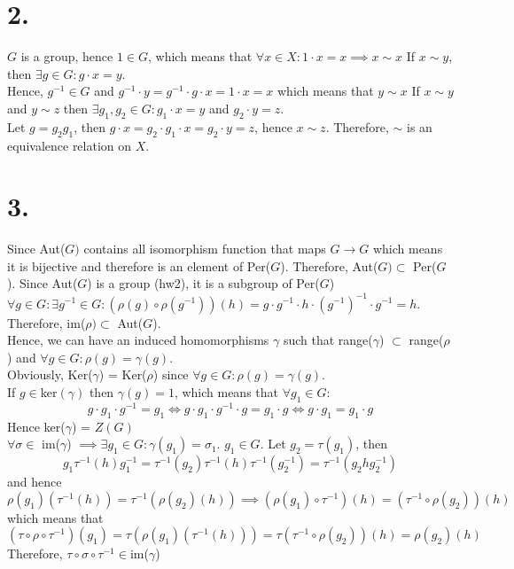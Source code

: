 \documentclass[11pt]{article}
\begin{document}
\section*{2.}
$G$ is a group, hence $1 \in G$, which means that $\forall x \in X: 1 \cdot x = x \implies x \sim x$
If $x \sim y$, then $\exists g \in G: g \cdot x = y$. \\
Hence, $g^{-1} \in G$ and $g^{-1} \cdot y = g^{-1} \cdot g \cdot x = 1 \cdot x = x$ which means that $y \sim x$
If $x \sim y$ and $y \sim z$ then $\exists g_1,g_2 \in G: g_1 \cdot x = y$ and $g_2 \cdot y = z$. \\
Let $g = g_2 g_1$, then $g \cdot x = g_2 \cdot g_1 \cdot x = g_2 \cdot y = z$, hence $x \sim z$.
Therefore, $\sim$ is an equivalence relation on $X$.
\pagebreak
\section*{3.}
Since Aut($G)$ contains all isomorphism function that maps $G \to G$ which means it is bijective and therefore is an element of Per($G$). Therefore, Aut($G ) \subset$ Per($G$). Since Aut($G$) is a group (hw2), it is a subgroup of Per($G$) \\ 
$\forall g \in G: \exists g^{-1} \in G: (\rho(g) \circ \rho(g^{-1}))(h) = g \cdot g^{-1} \cdot h \cdot (g^{-1})^{-1} \cdot g^{-1} =  h$.
Therefore, im($\rho ) \subset$ Aut($G$). \\
Hence, we can have an induced homomorphisms $\gamma$
such that range($\gamma$) $\subset$ range($\rho$) and $\forall g \in G: \rho(g) = \gamma(g)$. \\
Obviously, Ker($\gamma$) = Ker($\rho$) since $\forall g \in G: \rho(g) = \gamma(g)$. \\
If $g \in $ker$(\gamma)$ then $\gamma(g) = 1$, which means that $\forall g_1 \in G:$ 
\[g \cdot g_1 \cdot g^{-1} = g_1 \iff g \cdot g_1 \cdot g^{-1} \cdot g = g_1 \cdot g \iff g \cdot g_1 = g_1 \cdot g\] 
Hence ker($\gamma$) = $Z(G)$\\
$\forall \sigma \in$ im($\gamma$) $ \implies \exists g_1 \in G: \gamma(g_1) = \sigma_1$.
$g_1 \in G$. Let $g_2 = \tau(g_1)$, then 
\[
g_1 \tau^{-1}(h) g_1^{-1} = \tau^{-1}(g_2) \tau^{-1}(h) \tau^{-1} (g_2^{-1}) = \tau^{-1}(g_2hg_2^{-1}) 
\]
and hence 
\[
\rho(g_1) (\tau^{-1}(h)) = \tau^{-1}(\rho(g_2) (h)) \implies (\rho(g_1) \circ \tau^{-1})(h) = (\tau^{-1} \circ \rho(g_2)) (h)
\]
which means that 
\[
(\tau \circ \rho \circ \tau^{-1})(g_1) = \tau(\rho(g_1) (\tau^{-1}(h))) = \tau(\tau^{-1} \circ \rho(g_2))(h) = \rho(g_2)(h)
\]
Therefore, $\tau \circ \sigma \circ \tau^{-1} \in $im($\gamma$)
\pagebreak
\end{document}
